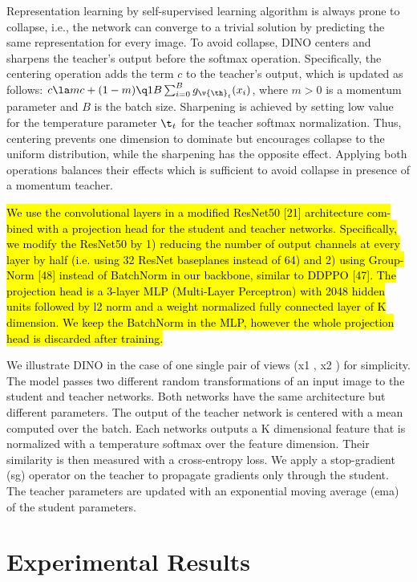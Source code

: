 \documentclass[letterpaper, 12pt]{article}
\theoremstyle{definition}
\theoremstyle{definition}
\theoremstyle{definition}
\theoremstyle{definition}
\theoremstyle{definition}
\newcommand{\vth}{\v{\th}}
\begin{document}
Representation learning by self-supervised learning algorithm is always prone to
collapse, i.e., the network can converge to a trivial solution by predicting the
same representation for every image. To avoid collapse, DINO centers and
sharpens the teacher’s output before the softmax operation. Specifically, the
centering operation adds the term \(c\) to the teacher’s output, which is
updated as follows: \(c\la mc+(1-m)\q1B\sum_{i=0}^{B}g_{\vth_{t}}(x_{i})\),
where \(m>0\) is a momentum parameter and \(B\) is the batch size. Sharpening is
achieved by setting low value for the temperature parameter \(\t_{t}\) for the
teacher softmax normalization. Thus, centering prevents one dimension to
dominate but encourages collapse to the uniform distribution, while the
sharpening has the opposite effect. Applying both operations balances their
effects which is sufficient to avoid collapse in presence of a momentum teacher.

\hl{We use the convolutional layers in a modified ResNet50 [21] architecture com-
bined with a projection head for the student and teacher networks. Specifically,
we modify the ResNet50 by 1) reducing the number of output channels at every
layer by half (i.e. using 32 ResNet baseplanes instead of 64) and 2) using Group-
Norm [48] instead of BatchNorm in our backbone, similar to DDPPO [47]. The
projection head is a 3-layer MLP (Multi-Layer Perceptron) with 2048 hidden
units followed by l2 norm and a weight normalized fully connected layer of K
dimension. We keep the BatchNorm in the MLP, however the whole projection
head is discarded after training.} 

\label{sec:org066f26c}


We illustrate DINO in
the case of one single pair of views (x1 , x2 ) for simplicity. The
model passes two different random transformations of an input
image to the student and teacher networks. Both networks have
the same architecture but different parameters. The output of the
teacher network is centered with a mean computed over the batch.
Each networks outputs a K dimensional feature that is normalized
with a temperature softmax over the feature dimension. Their
similarity is then measured with a cross-entropy loss. We apply a
stop-gradient (sg) operator on the teacher to propagate gradients
only through the student. The teacher parameters are updated with
an exponential moving average (ema) of the student parameters.

\section{Experimental Results \label{org0920a99}}
\label{sec:orga322a67}
\end{document}
